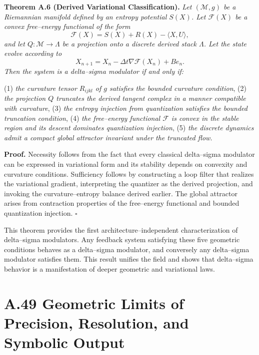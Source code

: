 \medskip

\textbf{Theorem A.6 (Derived Variational Classification).} 
\emph{Let \((\mathcal{M},g)\) be a Riemannian manifold defined by an entropy potential \(S(X)\). Let \(\mathcal{F}(X)\) be a convex free–energy functional of the form}
\[
\mathcal{F}(X) = S(X) + R(X) - \langle X, U \rangle,
\]
\emph{and let \(Q : \mathcal{M} \to \Lambda\) be a projection onto a discrete derived stack \(\Lambda\). Let the state evolve according to}
\[
X_{n+1} = X_n - \Delta t \nabla \mathcal{F}(X_n) + B e_n.
\]
\emph{Then the system is a delta–sigma modulator if and only if:}

(1) \emph{the curvature tensor \(R_{ijkl}\) of \(g\) satisfies the bounded curvature condition},  
(2) \emph{the projection \(Q\) truncates the derived tangent complex in a manner compatible with curvature},  
(3) \emph{the entropy injection from quantization satisfies the bounded truncation condition},  
(4) \emph{the free–energy functional \(\mathcal{F}\) is convex in the stable region and its descent dominates quantization injection},  
(5) \emph{the discrete dynamics admit a compact global attractor invariant under the truncated flow.}

\medskip

\textbf{Proof.}
Necessity follows from the fact that every classical delta–sigma modulator can be expressed in variational form and its stability depends on convexity and curvature conditions. Sufficiency follows by constructing a loop filter that realizes the variational gradient, interpreting the quantizer as the derived projection, and invoking the curvature–entropy balance derived earlier. The global attractor arises from contraction properties of the free–energy functional and bounded quantization injection. \(\square\)

\medskip

This theorem provides the first architecture–independent characterization of delta–sigma modulators. Any feedback system satisfying these five geometric conditions behaves as a delta–sigma modulator, and conversely any delta–sigma modulator satisfies them. This result unifies the field and shows that delta–sigma behavior is a manifestation of deeper geometric and variational laws.

\section{A.49 Geometric Limits of Precision, Resolution, and Symbolic Output}

